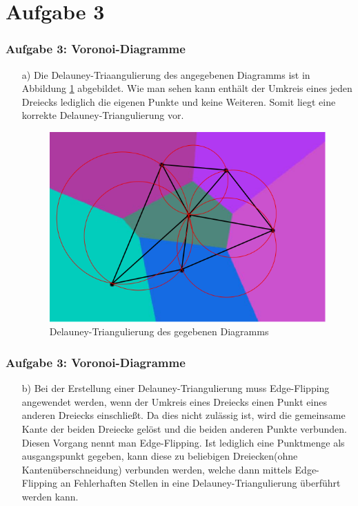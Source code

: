 \documentclass[accentcolor=tud9c,colorbacktitle,inverttitle,landscape,german,presentation,t]{tudbeamer}
\begin{document}
\section{Aufgabe 3}
\begin{frame}
	\frametitle{Aufgabe 3: Voronoi-Diagramme}
	\begin{itemize}
	\item[a)] %
	Die Delauney-Triaangulierung des angegebenen Diagramms ist in Abbildung \ref{DelTri} abgebildet. Wie man sehen kann enthält der Umkreis eines jeden Dreiecks lediglich die eigenen Punkte und keine Weiteren. Somit liegt eine korrekte Delauney-Triangulierung vor.
	\begin{figure}
		\includegraphics[width = .5\linewidth]{task_3a.png}
		\caption{Delauney-Triangulierung des gegebenen Diagramms}
		\label{DelTri}
	\end{figure}
	\end{itemize} 
\end{frame}
\begin{frame}
	\frametitle{Aufgabe 3: Voronoi-Diagramme}
	\begin{itemize}
	\item[b)] %
	Bei der Erstellung einer Delauney-Triangulierung muss Edge-Flipping angewendet werden, wenn der Umkreis eines Dreiecks einen Punkt eines anderen Dreiecks einschließt. Da dies nicht zulässig ist, wird die gemeinsame Kante der beiden Dreiecke gelöst und die beiden anderen Punkte verbunden. Diesen Vorgang nennt man Edge-Flipping. Ist lediglich eine Punktmenge als ausgangspunkt gegeben, kann diese zu beliebigen Dreiecken(ohne Kantenüberschneidung)  verbunden werden, welche dann mittels Edge-Flipping an Fehlerhaften Stellen in eine Delauney-Triangulierung überführt werden kann. 
	\end{itemize} 
\end{frame}
\end{document}
